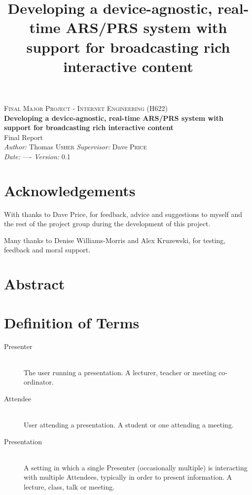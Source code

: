 \documentclass[a4papert,11pt,notitlepage]{ltxdoc}
\title{Developing a device-agnostic, real-time ARS/PRS system with support for
broadcasting rich interactive content}
\begin{document}
\vspace*{\fill}
\begin{center}
\textsc{\Large Final Major Project - Internet Engineering (H622)}\\[0.3cm]
{\Large \bfseries Developing a device-agnostic, real-time ARS/PRS system with support for
broadcasting rich interactive content}\\[0.3cm]
{\Large Final Report}\\[0.3cm]
\emph{Author:} Thomas \textsc{Usher} \hspace{1cm} \emph{Supervisor:} Dave \textsc{Price}\\
\emph{Date:} ---- \hspace{1cm} \emph{Version:} 0.1
\end{center}
\vspace*{\fill}
\pagebreak

\section*{Acknowledgements}
With thanks to Dave Price, for feedback, advice and suggestions to myself and the rest of the project group during the development of this project.

Many thanks to Denise Williams-Morris and Alex Kruzewski, for testing, feedback and moral support.

\listoftodos{}
\pagebreak

\section*{Abstract}

\section*{Definition of Terms}
\begin{description}
\item[Presenter] \hfill \\
The user running a presentation. A lecturer, teacher or meeting co-ordinator.
\item[Attendee] \hfill \\
User attending a presentation. A student or one attending a meeting.
\item[Presentation] \hfill \\
A setting in which a single Presenter (occasionally multiple) is interacting with multiple Attendees, typically in order to present information. A lecture, class, talk or meeting.
\end{description}
\end{document}
